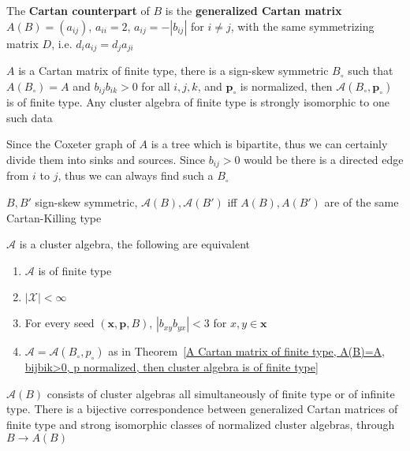 \documentclass[main]{subfiles}
\begin{document}
\begin{definition}
The \textbf{Cartan counterpart} of $B$ is the \textbf{generalized Cartan matrix} $A(B)=(a_{ij})$, $a_{ii}=2$, $a_{ij}=-|b_{ij}|$ for $i\neq j$, with the same symmetrizing matrix $D$, i.e. $d_ia_{ij}=d_ja_{ji}$
\end{definition}

\begin{theorem}\label{A Cartan matrix of finite type, A(B)=A, bijbik>0, p normalized, then cluster algebra is of finite type}
$A$ is a Cartan matrix of finite type, there is a sign-skew symmetric $B_\circ$ such that $A(B_\circ)=A$ and $b_{ij}b_{ik}>0$ for all $i,j,k$, and $\mathbf p_\circ$ is normalized, then $\mathcal A(B_\circ,\mathbf p_\circ)$ is of finite type. Any cluster algebra of finite type is strongly isomorphic to one such data
\end{theorem}

\begin{remark}
Since the Coxeter graph of $A$ is a tree which is bipartite, thus we can certainly divide them into sinks and sources. Since $b_{ij}>0$ would be there is a directed edge from $i$ to $j$, thus we can always find such a $B_\circ$
\end{remark}

\begin{theorem}
$B,B'$ sign-skew symmetric, $\mathcal A(B),\mathcal A(B')$ iff $A(B),A(B')$ are of the same Cartan-Killing type
\end{theorem}

\begin{theorem}
$\mathcal A$ is a cluster algebra, the following are equivalent
\begin{enumerate}[leftmargin=*,label=(\roman*)]
\item $\mathcal A$ is of finite type
\item $|\mathcal X|<\infty$
\item For every seed $(\mathbf x,\mathbf p,B)$, $|b_{xy}b_{yx}|<3$ for $x,y\in\mathbf x$
\item $\mathcal A=\mathcal A(B_\circ,p_\circ)$ as in Theorem~\ref{A Cartan matrix of finite type, A(B)=A, bijbik>0, p normalized, then cluster algebra is of finite type}
\end{enumerate}
\end{theorem}

\begin{theorem}
$\mathcal A(B)$ consists of cluster algebras all simultaneously of finite type or of infinite type. There is a bijective correspondence between generalized Cartan matrices of finite type and strong isomorphic classes of normalized cluster algebras, through $B\rightarrow A(B)$
\end{theorem}
\end{document}
